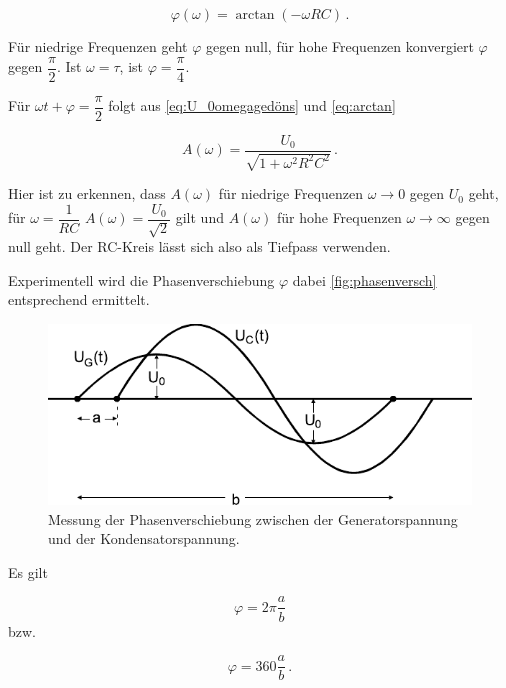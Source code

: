 \begin{equation}
    \varphi (ω) = \arctan(-ω R C) \,.
    \label{eq:arctan}
\end{equation}

Für niedrige Frequenzen geht $\varphi$ gegen null, für hohe Frequenzen konvergiert $\varphi$ gegen $\dfrac{\pi}{2}$.
Ist $\omega = \tau$, ist $\varphi = \dfrac{\pi}{4}$.

Für $\omega t + \varphi  = \dfrac{\pi}{2}$ folgt aus \eqref{eq:U_0omegagedöns} und \eqref{eq:arctan}

\begin{equation}
    A(\omega) = \frac{U_0}{\sqrt{1 + \omega^2 R^2 C^2}} \,.
\end{equation}

Hier ist zu erkennen, dass $A(\omega)$ für niedrige Frequenzen $\omega \rightarrow 0$ gegen $U_0$ geht, für $\omega = \dfrac{1}{RC}$ $A(\omega) = \dfrac{U_0}{\sqrt{2}}$ gilt und $A(\omega)$ für hohe Frequenzen $\omega \rightarrow \infty$ gegen null geht.
Der RC-Kreis lässt sich also als Tiefpass verwenden.

Experimentell wird die Phasenverschiebung $\varphi$ dabei \autoref{fig:phasenversch} entsprechend ermittelt.

\begin{figure}
    \centering
    \includegraphics{figures/Phasenverschiebung.pdf}
    \caption{Messung der Phasenverschiebung zwischen der Generatorspannung und der Kondensatorspannung\cite{ap08}.}
    \label{fig:phasenversch}
\end{figure}
Es gilt

\begin{equation}
    \varphi = 2 \pi \frac{a}{b} 
    \label{eq:phasebogen}
\end{equation} bzw.

\begin{equation}
    \varphi = 360 \frac{a}{b} \,.
    \label{eq:phasegrad}
\end{equation}

